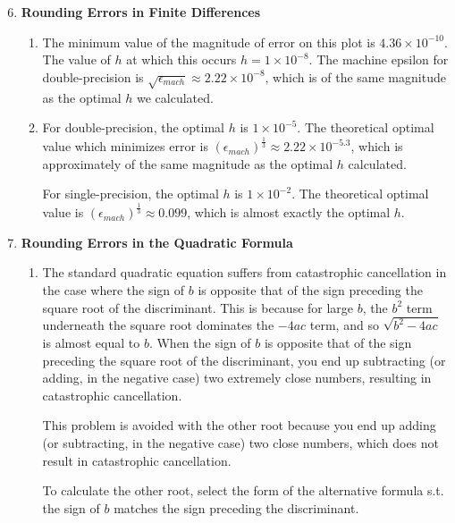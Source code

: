 \documentclass{article}
\theoremstyle{definition}
\theoremstyle{remark}
\begin{document}
\begin{enumerate}
    \setcounter{enumi}{5}
    \item \textbf{Rounding Errors in Finite Differences}
    \begin{enumerate}
        \item The minimum value of the magnitude of error on this plot is \(4.36\times 10^{-10}\). The value of \(h\) at which this occurs \(h = 1\times 10^{-8}\). The machine epsilon for double-precision is \(\sqrt{\epsilon_{mach}} \approx 2.22\times 10^{-8}\), which is of the same magnitude as the optimal \(h\) we calculated.

        \item For double-precision, the optimal \(h\) is \(1\times 10^{-5}\). The theoretical optimal value which minimizes error is \((\epsilon_{mach})^{\frac{1}{3}} \approx 2.22 \times 10^{-5.3}\), which is approximately of the same magnitude as the optimal \(h\) calculated.

        For single-precision, the optimal \(h\) is \(1\times10^{-2}\). The theoretical optimal value is \((\epsilon_{mach})^{\frac{1}{3}} \approx 0.099\), which is almost exactly the optimal \(h\).
    \end{enumerate}

\item \textbf{Rounding Errors in the Quadratic Formula}
    \begin{enumerate}
        \item The standard quadratic equation suffers from catastrophic cancellation in the case where the sign of \(b\) is opposite that of the sign preceding the square root of the discriminant. This is because for large \(b\), the \(b^{2}\) term underneath the square root dominates the \(-4ac\) term, and so \(\sqrt{ b^{2}-4ac }\) is almost equal to \(b\). When the sign of \(b\) is opposite that of the sign preceding the square root of the discriminant, you end up subtracting (or adding, in the negative case) two extremely close numbers, resulting in catastrophic cancellation. 

        This problem is avoided with the other root because you end up adding (or subtracting, in the negative case) two close numbers, which does not result in catastrophic cancellation.

        To calculate the other root, select the form of the alternative formula s.t. the sign of \(b\) matches the sign preceding the discriminant.


\end{enumerate}
\end{enumerate}
\end{document}
